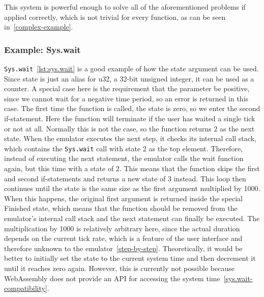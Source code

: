 This system is powerful enough to solve all of the aforementioned problems if applied correctly, which is not trivial for every function, as can be seen in~\cref{complex-example}.
\subsubsection{Example: Sys.wait} \label{sys.wait-example}
\verb+Sys.wait+~\ref{lst:sys.wait} is a good example of how the state argument can be used.
Since state is just an alias for u32, a 32-bit unsigned integer, it can be used as a counter.
A special case here is the requirement that the parameter be positive, since we cannot wait for a negative time period, so an error is returned in this case.
The first time the function is called, the state is zero, so we enter the second if-statement. Here the function will terminate if the user has waited a single tick or not at all.
Normally this is not the case, so the function returns 2 as the next state.
When the emulator executes the next step, it checks its internal call stack, which contains the \verb+Sys.wait+ call with state 2 as the top element.
Therefore, instead of executing the next statement, the emulator calls the wait function again, but this time with a state of 2. This means that the function skips the first and second if-statements and returns a new state of 3 instead.
This loop then continues until the state is the same size as the first argument multiplied by 1000. When this happens, the original first argument is returned inside the special Finished state, which means that the function should be removed from the emulator's internal call stack and the next statement can finally be executed.
The multiplication by 1000 is relatively arbitrary here, since the actual duration depends on the current tick rate, which is a feature of the user interface and therefore unknown to the emulator~\ref{step-by-step}.
Theoretically, it would be better to initially set the state to the current system time and then decrement it until it reaches zero again. However, this is currently not possible because WebAssembly does not provide an API for accessing the system time~\ref{sys.wait-compatibility}.

